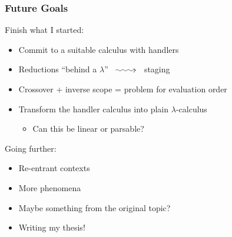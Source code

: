 \documentclass{beamer}
\makeatletter
\newcommand{\longsquiggly}{\xymatrix{{}\ar@{~>}[r]&{}}}
\makeatother
\begin{document}
\begin{frame}
  \frametitle{Future Goals}

  Finish what I started:
  \begin{itemize}
  \item Commit to a suitable calculus with handlers
  \item Reductions ``behind a $\lambda$'' $\longsquiggly$ staging
  \item Crossover + inverse scope = problem for evaluation order
  \item Transform the handler calculus into plain $\lambda$-calculus
    \begin{itemize}
    \item Can this be linear or parsable?
    \end{itemize}
  \end{itemize}
  \vfill
  \pause
  Going further:
  \begin{itemize}
  \item Re-entrant contexts
  \item More phenomena
  \item Maybe something from the original topic?
  \item Writing my thesis!
  \end{itemize}
\end{frame}
\end{document}
